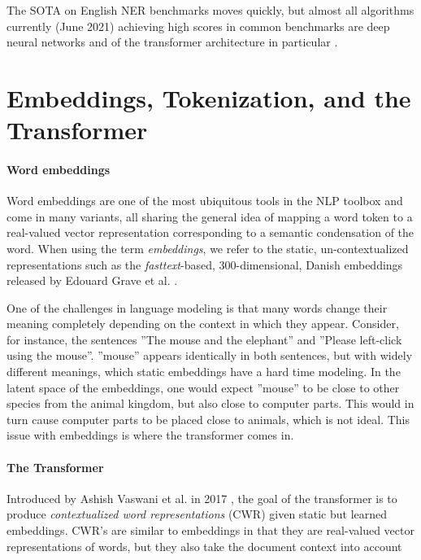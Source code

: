 \documentclass[main.tex]{subfiles}
\begin{document}
The SOTA on English NER benchmarks moves quickly, but almost all algorithms currently (June 2021) achieving high scores in common benchmarks are deep neural networks and of the transformer architecture in particular \cite{ruder21ner, pwc21ner}.

\section{Embeddings, Tokenization, and the Transformer}
\label{sec:transformers}

\paragraph{Word embeddings}
Word embeddings are one of the most ubiquitous tools in the NLP toolbox and come in many variants, all sharing the general idea of mapping a word token to a real-valued vector representation corresponding to a semantic condensation of the word.
When using the term \emph{embeddings}, we refer to the static, un-contextualized representations such as the \emph{fasttext}-based, 300-dimensional, Danish embeddings released by Edouard Grave et al. \cite{grave2018learning}.

One of the challenges in language modeling is that many words change their meaning completely depending on the context in which they appear.
Consider, for instance, the sentences ''The mouse and the elephant'' and ''Please left-click using the mouse''.
''mouse'' appears identically in both sentences, but with widely different meanings, which static embeddings have a hard time modeling.
In the latent space of the embeddings, one would expect ''mouse'' to be close to other species from the animal kingdom, but also close to computer parts.
This would in turn cause computer parts to be placed close to animals, which is not ideal.
This issue with embeddings is where the transformer comes in.

\paragraph{The Transformer}
Introduced by Ashish Vaswani et al. in 2017 \cite{vaswani2017att}, the goal of the transformer is to produce \emph{contextualized word representations} (CWR) given static but learned embeddings.
CWR's are similar to embeddings in that they are real-valued vector representations of words, but they also take the document context into account
\end{document}

